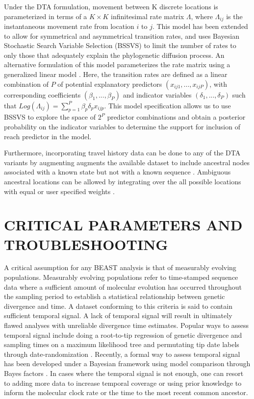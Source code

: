 \documentclass{article}
\begin{document}
\begin{multicols}{2}
Under the DTA formulation, movement between K discrete locations is parameterized in terms of a $K \times K$ infinitesimal rate matrix $\Lambda$, where $\Lambda_{ij}$ is the instantaneous movement rate from location $i$ to $j$. This model has been extended to allow for symmetrical and asymmetrical transition rates, and uses Bayesian Stochastic Search Variable Selection (BSSVS) to limit the number of rates to only those that adequately explain the phylogenetic diffusion process. An alternative formulation of this model parameterizes the rate matrix using a generalized linear model \cite{glm}. Here, the transition rates are defined as a linear combination of $P$ of potential explanatory predictors $(x_{ij1}, \dots, x_{ijP})$, with corresponding coefficients $(\beta_1, ..., \beta_P )$ and indicator variables $(\delta_1, ..., \delta_P )$ such that $Log(\Lambda_{ij}) = \sum_{p=1}^P \beta_p \delta_p x_{ijp}$. This model specification allows us to use BSSVS to explore the space of $2^P$ predictor combinations and obtain a posterior probability on the indicator variables to determine the support for inclusion of reach predictor in the model.

Furthermore, incorporating travel history data can be done to any of the DTA variants by augmenting augments the available dataset to include ancestral nodes associated with a known state but not with a known sequence \cite{travhist}. Ambiguous ancestral locations can be allowed by integrating over the all possible locations with equal or user specified weights \cite{ambig}.

\section*{CRITICAL PARAMETERS AND TROUBLESHOOTING}
A critical assumption for any BEAST analysis is that of measurably evolving populations. Measurably evolving populations \cite{mep1,mep2} refer to time-stamped sequence data where a sufficient amount of molecular evolution has occurred throughout the sampling period to establish a statistical relationship between genetic divergence and time. A dataset conforming to this criteria is said to contain sufficient temporal signal. A lack of temporal signal will result in ultimately flawed analyses with unreliable divergence time estimates. Popular ways to assess temporal signal include doing a root-to-tip regression of genetic divergence and sampling times on a maximum likelihood tree \cite{tempest} and permutating tip date labels through date-randomization \cite{tipdate}. Recently, a formal way to assess temporal signal has been developed under a Bayesian framework using model comparison through Bayes factors \cite{bets}. In cases where the temporal signal is not enough, one can resort to adding more data to increase temporal coverage or using prior knowledge to inform the molecular clock rate or the time to the most recent common ancestor.


\end{multicols}
\end{document}

